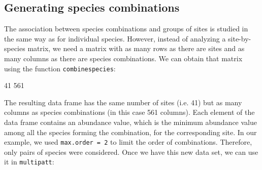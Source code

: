 \documentclass[11pt,a4paper]{article}
\begin{document}
\subsection{Generating species combinations}
The association between species combinations and groups of sites is studied in the same way as for individual species. However, instead of analyzing a site-by-species matrix, we need a matrix with as many rows as there are sites and as many columns as there are species combinations. We can obtain that matrix using the function \texttt{combinespecies}:
\begin{Schunk}
\begin{Soutput}
[1]  41 561
\end{Soutput}
\end{Schunk}
The resulting data frame has the same number of sites (i.e. 41) but as many columns as species combinations (in this case 561 columns). Each element of the data frame contains an abundance value, which is the minimum abundance value among all the species forming the combination, for the corresponding site. In our example, we used \texttt{max.order = 2} to limit the order of combinations. Therefore, only pairs of species were considered. Once we have this new data set, we can use it in \texttt{multipatt}:
\end{document}
